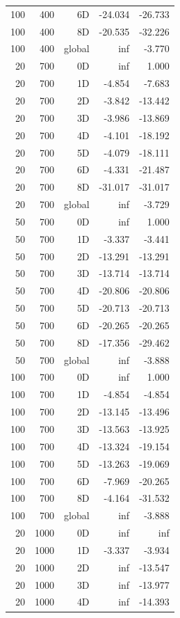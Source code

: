 \begin{longtable}{rrrrr}
100 & 400 & 6D & -24.034 & -26.733 \\
100 & 400 & 8D & -20.535 & -32.226 \\
100 & 400 & global & inf & -3.770 \\
20 & 700 & 0D & inf & 1.000 \\
20 & 700 & 1D & -4.854 & -7.683 \\
20 & 700 & 2D & -3.842 & -13.442 \\
20 & 700 & 3D & -3.986 & -13.869 \\
20 & 700 & 4D & -4.101 & -18.192 \\
20 & 700 & 5D & -4.079 & -18.111 \\
20 & 700 & 6D & -4.331 & -21.487 \\
20 & 700 & 8D & -31.017 & -31.017 \\
20 & 700 & global & inf & -3.729 \\
50 & 700 & 0D & inf & 1.000 \\
50 & 700 & 1D & -3.337 & -3.441 \\
50 & 700 & 2D & -13.291 & -13.291 \\
50 & 700 & 3D & -13.714 & -13.714 \\
50 & 700 & 4D & -20.806 & -20.806 \\
50 & 700 & 5D & -20.713 & -20.713 \\
50 & 700 & 6D & -20.265 & -20.265 \\
50 & 700 & 8D & -17.356 & -29.462 \\
50 & 700 & global & inf & -3.888 \\
100 & 700 & 0D & inf & 1.000 \\
100 & 700 & 1D & -4.854 & -4.854 \\
100 & 700 & 2D & -13.145 & -13.496 \\
100 & 700 & 3D & -13.563 & -13.925 \\
100 & 700 & 4D & -13.324 & -19.154 \\
100 & 700 & 5D & -13.263 & -19.069 \\
100 & 700 & 6D & -7.969 & -20.265 \\
100 & 700 & 8D & -4.164 & -31.532 \\
100 & 700 & global & inf & -3.888 \\
20 & 1000 & 0D & inf & inf \\
20 & 1000 & 1D & -3.337 & -3.934 \\
20 & 1000 & 2D & inf & -13.547 \\
20 & 1000 & 3D & inf & -13.977 \\
20 & 1000 & 4D & inf & -14.393 \\

\end{longtable}
